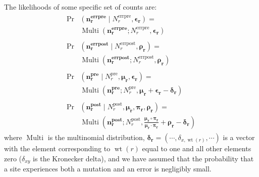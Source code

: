 \documentclass[twocolumn]{bmcart}%
\begin{document}
The likelihoods of some specific set of counts are:
\begin{gather}
\begin{split} \Pr&\left(\mathbf{n_r^{\textbf{errpre}}} \mid N_r^{\textrm{errpre}}, \boldsymbol{\mathbf{\epsilon_r}}\right) = \\& \operatorname{Multi}\left(\mathbf{n_r^{\textbf{errpre}}}; N_r^{\textrm{errpre}}, \boldsymbol{\mathbf{\epsilon_r}}\right) \label{eq:pr_nrerrpre} \end{split} \\
\begin{split} \Pr&\left(\mathbf{n_r^{\textbf{errpost}}} \mid N_r^{\textrm{errpost}}, \boldsymbol{\mathbf{\rho_r}}\right) = \\ & \operatorname{Multi}\left(\mathbf{n_r^{\textbf{errpost}}}; N_r^{\textrm{errpost}}, \boldsymbol{\mathbf{\rho_r}}\right) \label{eq:pr_nrerrpost} \end{split} \\
\begin{split} \Pr&\left(\mathbf{n_r^{\textbf{pre}}}\mid N_r^{\textrm{pre}}, \boldsymbol{\mathbf{\mu_r}}, \boldsymbol{\mathbf{\epsilon_r}}\right) = \\ &\operatorname{Multi}\left(\mathbf{n_r^{\textbf{pre}}}; N_r^{\textrm{pre}}, \boldsymbol{\mathbf{\mu_r}}+ \boldsymbol{\mathbf{\epsilon_r}}- \boldsymbol{\mathbf{\delta_r}}\right) \label{eq:pr_nrpre} \end{split} \\
\begin{split} \Pr&\left(\mathbf{n_r^{\textbf{post}}} \mid N_r^{\textrm{post}}, \boldsymbol{\mathbf{\mu_r}}, \boldsymbol{\mathbf{\pi_r}}, \boldsymbol{\mathbf{\rho_r}}\right) = \\ &\operatorname{Multi}\left(\mathbf{n_r^{\textbf{post}}}; N_r^{\textrm{post}}, \frac{\boldsymbol{\mathbf{\mu_r}}\circ \boldsymbol{\mathbf{\pi_r}}}{\boldsymbol{\mathbf{\mu_r}}\cdot \boldsymbol{\mathbf{\pi_r}}} + \boldsymbol{\mathbf{\rho_r}}- \boldsymbol{\mathbf{\delta_r}}\right)\label{eq:pr_nrpost} \end{split}
\end{gather}
where $\operatorname{Multi}$ is the multinomial distribution, $\boldsymbol{\mathbf{\delta_r}} = \left(\cdots, \delta_{x, \operatorname{wt}\left(r\right)}, \cdots\right)$ is a vector with the element corresponding to $\operatorname{wt}\left(r\right)$ equal to one and all other elements zero ($\delta_{xy}$ is the Kronecker delta), and we have assumed that the probability that a site experiences both a mutation and an error is negligibly small.
\end{document}
